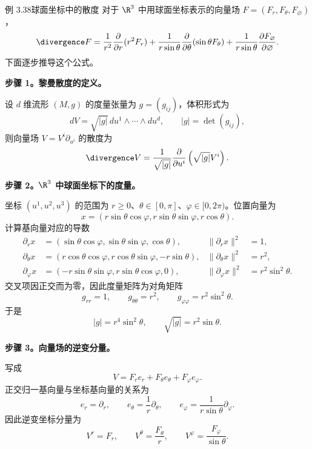 \begin{statement}{例 3.38}{球面坐标中的散度}
对于 $\R^3$ 中用球面坐标表示的向量场 $F=(F_r,F_\theta,F_\varnothing)$，
\[
  \divergence F=\frac{1}{r^2}\frac{\partial}{\partial r}(r^2F_r)
  +\frac{1}{r\sin\theta}\frac{\partial}{\partial\theta}(\sin\theta F_\theta)
  +\frac{1}{r\sin\theta}\frac{\partial F_\varnothing}{\partial\varnothing}.
\]
下面逐步推导这个公式。

\noindent\textbf{步骤 1。黎曼散度的定义。}\par
设 $d$ 维流形 $(M,g)$ 的度量张量为 $g=(g_{ij})$，体积形式为
\[
  dV=\sqrt{|g|}\,du^1\wedge\cdots\wedge du^d,\qquad |g|=\det(g_{ij}),
\]
则向量场 $V=V^i\partial_{u^i}$ 的散度为
\[
  \divergence V=\frac{1}{\sqrt{|g|}}\frac{\partial}{\partial u^i}
  \left(\sqrt{|g|}V^i\right).
\]

\noindent\textbf{步骤 2。$\R^3$ 中球面坐标下的度量。}\par
坐标 $(u^1,u^2,u^3)$ 的范围为 $r\geq0$、$\theta\in[0,\pi]$、$\varphi\in[0,2\pi)$。位置向量为
\[
  x=(r\sin\theta\cos\varphi,r\sin\theta\sin\varphi,r\cos\theta).
\]
计算基向量对应的导数
\begin{align*}
  \partial_r x&=(\sin\theta\cos\varphi,\sin\theta\sin\varphi,\cos\theta),
    &\lVert\partial_r x\rVert^2&=1,\\
  \partial_\theta x&=(r\cos\theta\cos\varphi,r\cos\theta\sin\varphi,-r\sin\theta),
    &\lVert\partial_\theta x\rVert^2&=r^2,\\
  \partial_\varphi x&=(-r\sin\theta\sin\varphi,r\sin\theta\cos\varphi,0),
    &\lVert\partial_\varphi x\rVert^2&=r^2\sin^2\theta.
\end{align*}
交叉项因正交而为零，因此度量矩阵为对角矩阵
\[
  g_{rr}=1,\qquad g_{\theta\theta}=r^2,\qquad g_{\varphi\varphi}=r^2\sin^2\theta.
\]
于是
\[
  |g|=r^4\sin^2\theta,\qquad\sqrt{|g|}=r^2\sin\theta.
\]

\noindent\textbf{步骤 3。向量场的逆变分量。}\par
写成
\[
  V=F_re_r+F_\theta e_\theta+F_\varphi e_\varphi.
\]
正交归一基向量与坐标基向量的关系为
\[
  e_r=\partial_r,\qquad e_\theta=\frac1r\partial_\theta,\qquad
  e_\varphi=\frac1{r\sin\theta}\partial_\varphi.
\]
因此逆变坐标分量为%
%
\[
  V^r=F_r,\qquad V^\theta=\frac{F_\theta}{r},\qquad
  V^\varphi=\frac{F_\varphi}{\sin\theta}.
\]


\end{statement}
